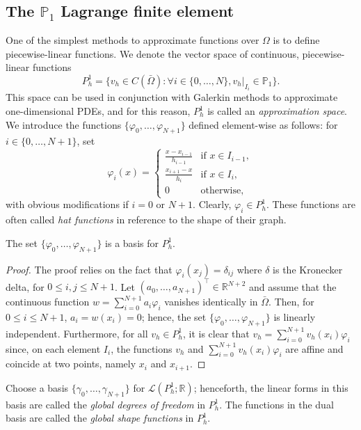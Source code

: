 \subsection{The $\mathbb{P}_1$ Lagrange finite element}
One of the simplest methods to approximate functions over $\Omega$ is to define piecewise-linear functions. We denote the vector space of continuous, piecewise-linear functions
\begin{equation}
    P_h^1 = \{ v_h \in C(\bar{\Omega}): \forall i \in \{0, \dots, N\}, v_h|_{I_i} \in \mathbb{P}_1 \}.
\end{equation}
This space can be used in conjunction with Galerkin methods to approximate one-dimensional PDEs, and for this reason, $P_h^1$ is called an \emph{approximation space}. We introduce the functions $\{\varphi_0, \dots, \varphi_{N+1}\}$ defined element-wise as follows: for $i \in \{0, \dots, N+1\}$, set
\begin{equation}
    \varphi_i(x) = \begin{cases} \frac{x - x_{i-1}}{h_{i-1}} & \text{if } x \in I_{i-1}, \\ \frac{x_{i+1} - x}{h_i} & \text{if } x \in I_i, \\ 0 & \text{otherwise}, \end{cases}
\end{equation}
with obvious modifications if $i = 0$ or $N+1$. Clearly, $\varphi_i \in P_h^1$. These functions are often called \emph{hat functions} in reference to the shape of their graph.
\begin{lemma}\label{lemma:hatbasis}
    The set $\{\varphi_0, \dots, \varphi_{N+1}\}$ is a basis for $P_h^1$.
    \begin{proof}
        The proof relies on the fact that $\varphi_i(x_j) = \delta_{ij}$ where $\delta$ is the Kronecker delta, for $0 \le i,j \le N+1$. Let $(a_0, \dots, a_{N+1})^\top \in \mathbb{R}^{N+2}$ and assume that the continuous function $w = \sum_{i=0}^{N+1} a_i \varphi_i$ vanishes identically in $\bar{\Omega}$. Then, for $0 \le i \le N+1$, $a_i = w(x_i) = 0$; hence, the set $\{\varphi_0, \dots, \varphi_{N+1}\}$ is linearly independent. Furthermore, for all $v_h \in P_h^1$, it is clear that $v_h = \sum_{i=0}^{N+1} v_h(x_i) \varphi_i$ since, on each element $I_i$, the functions $v_h$ and $\sum_{i=0}^{N+1} v_h(x_i) \varphi_i$ are affine and coincide at two points, namely $x_i$ and $x_{i+1}$.
    \end{proof}
\end{lemma}
\begin{definition}\label{def:global-shape-functions}
    Choose a basis $\{\gamma_0, \dots, \gamma_{N+1}\}$ for $\mathcal{L}(P_h^1;\mathbb{R})$; henceforth, the linear forms in this basis are called the \emph{global degrees of freedom} in $P_h^1$. The functions in the dual basis are called the \emph{global shape functions} in $P_h^1$. 
\end{definition}

